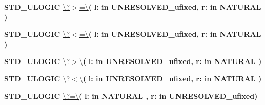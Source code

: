\begin{DoxyCompactItemize}
\item 
{\bfseries {\bfseries \textcolor{comment}{S\+T\+D\+\_\+\+U\+L\+O\+G\+I\+C}\textcolor{vhdlchar}{ }}} \hyperlink{classfixed__pkg_a3adee8c12e5c0bb76fc3e1a493284a27}{\textbackslash{}?$>$=\textbackslash{}}{\bfseries  ( }{\bfseries \textcolor{vhdlchar}{l\+: }\textcolor{stringliteral}{in }\textcolor{vhdlchar}{U\+N\+R\+E\+S\+O\+L\+V\+E\+D\+\_\+ufixed}}{\bfseries  , \textcolor{vhdlchar}{r\+: }\textcolor{stringliteral}{in }{\bfseries \textcolor{comment}{N\+A\+T\+U\+R\+A\+L}\textcolor{vhdlchar}{ }}}{\bfseries  )} 
\item 
{\bfseries {\bfseries \textcolor{comment}{S\+T\+D\+\_\+\+U\+L\+O\+G\+I\+C}\textcolor{vhdlchar}{ }}} \hyperlink{classfixed__pkg_a271da29f659a2bc9480dbd29d7727913}{\textbackslash{}?$<$=\textbackslash{}}{\bfseries  ( }{\bfseries \textcolor{vhdlchar}{l\+: }\textcolor{stringliteral}{in }\textcolor{vhdlchar}{U\+N\+R\+E\+S\+O\+L\+V\+E\+D\+\_\+ufixed}}{\bfseries  , \textcolor{vhdlchar}{r\+: }\textcolor{stringliteral}{in }{\bfseries \textcolor{comment}{N\+A\+T\+U\+R\+A\+L}\textcolor{vhdlchar}{ }}}{\bfseries  )} 
\item 
{\bfseries {\bfseries \textcolor{comment}{S\+T\+D\+\_\+\+U\+L\+O\+G\+I\+C}\textcolor{vhdlchar}{ }}} \hyperlink{classfixed__pkg_a9e6b6b8c2c14da978e6f70cb6e85e6dc}{\textbackslash{}?$>$\textbackslash{}}{\bfseries  ( }{\bfseries \textcolor{vhdlchar}{l\+: }\textcolor{stringliteral}{in }\textcolor{vhdlchar}{U\+N\+R\+E\+S\+O\+L\+V\+E\+D\+\_\+ufixed}}{\bfseries  , \textcolor{vhdlchar}{r\+: }\textcolor{stringliteral}{in }{\bfseries \textcolor{comment}{N\+A\+T\+U\+R\+A\+L}\textcolor{vhdlchar}{ }}}{\bfseries  )} 
\item 
{\bfseries {\bfseries \textcolor{comment}{S\+T\+D\+\_\+\+U\+L\+O\+G\+I\+C}\textcolor{vhdlchar}{ }}} \hyperlink{classfixed__pkg_a7e98e66a4a282c529968f69f70dd16ad}{\textbackslash{}?$<$\textbackslash{}}{\bfseries  ( }{\bfseries \textcolor{vhdlchar}{l\+: }\textcolor{stringliteral}{in }\textcolor{vhdlchar}{U\+N\+R\+E\+S\+O\+L\+V\+E\+D\+\_\+ufixed}}{\bfseries  , \textcolor{vhdlchar}{r\+: }\textcolor{stringliteral}{in }{\bfseries \textcolor{comment}{N\+A\+T\+U\+R\+A\+L}\textcolor{vhdlchar}{ }}}{\bfseries  )} 
\item 
{\bfseries {\bfseries \textcolor{comment}{S\+T\+D\+\_\+\+U\+L\+O\+G\+I\+C}\textcolor{vhdlchar}{ }}} \hyperlink{classfixed__pkg_a69151531d87456d952c2073704fa1779}{\textbackslash{}?=\textbackslash{}}{\bfseries  ( }{\bfseries \textcolor{vhdlchar}{l\+: }\textcolor{stringliteral}{in }{\bfseries \textcolor{comment}{N\+A\+T\+U\+R\+A\+L}\textcolor{vhdlchar}{ }}}{\bfseries  , \textcolor{vhdlchar}{r\+: }\textcolor{stringliteral}{in }\textcolor{vhdlchar}{U\+N\+R\+E\+S\+O\+L\+V\+E\+D\+\_\+ufixed}}{\bfseries  )} 

\end{DoxyCompactItemize}
